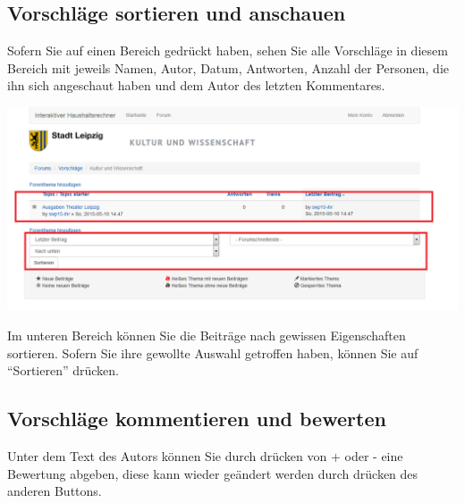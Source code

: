 \documentclass[a4paper,11pt,twoside]{article}
\begin{document}
\subsection{Vorschl\"age sortieren und anschauen}
Sofern Sie auf einen Bereich gedr\"uckt haben, sehen Sie alle Vorschl\"age in
diesem Bereich mit jeweils Namen, Autor, Datum, Antworten, Anzahl der
Personen, die ihn sich angeschaut haben und dem Autor des letzten Kommentares.

\begin{center}
  \includegraphics[width=\textwidth]{Bilder/forumsort.png}
\end{center}
Im unteren Bereich k\"onnen Sie die Beitr\"age nach gewissen Eigenschaften
sortieren. Sofern Sie ihre gewollte Auswahl getroffen haben, k\"onnen Sie auf
"`Sortieren"' dr\"ucken.

\subsection{Vorschl\"age kommentieren und bewerten}
Unter dem Text des Autors k\"onnen Sie durch dr\"ucken von + oder - eine
Bewertung abgeben, diese kann wieder ge\"andert werden durch dr\"ucken des
anderen Buttons.
\end{document}
